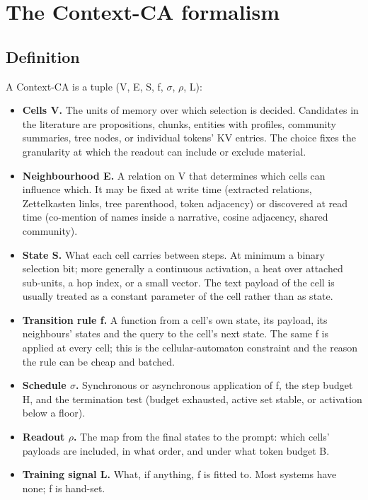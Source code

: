 \documentclass[11pt]{article}
\begin{document}
\section{The Context-CA formalism}

\subsection{Definition}

A Context-CA is a tuple (V, E, S, f, $\sigma$, $\rho$, L):

\begin{itemize}
\item \textbf{Cells V.} The units of memory over which selection is decided. Candidates in the literature are propositions, chunks, entities with profiles, community summaries, tree nodes, or individual tokens' KV entries. The choice fixes the granularity at which the readout can include or exclude material.
\item \textbf{Neighbourhood E.} A relation on V that determines which cells can influence which. It may be fixed at write time (extracted relations, Zettelkasten links, tree parenthood, token adjacency) or discovered at read time (co-mention of names inside a narrative, cosine adjacency, shared community).
\item \textbf{State S.} What each cell carries between steps. At minimum a binary selection bit; more generally a continuous activation, a heat over attached sub-units, a hop index, or a small vector. The text payload of the cell is usually treated as a constant parameter of the cell rather than as state.
\item \textbf{Transition rule f.} A function from a cell's own state, its payload, its neighbours' states and the query to the cell's next state. The same f is applied at every cell; this is the cellular-automaton constraint and the reason the rule can be cheap and batched.
\item \textbf{Schedule $\sigma$.} Synchronous or asynchronous application of f, the step budget H, and the termination test (budget exhausted, active set stable, or activation below a floor).
\item \textbf{Readout $\rho$.} The map from the final states to the prompt: which cells' payloads are included, in what order, and under what token budget B.
\item \textbf{Training signal L.} What, if anything, f is fitted to. Most systems have none; f is hand-set.
\end{itemize}
\end{document}

